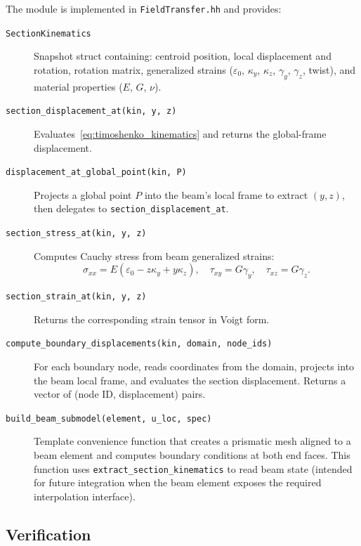 The module is implemented in \texttt{FieldTransfer.hh} and provides:

\begin{description}
  \item[\texttt{SectionKinematics}] Snapshot struct containing: centroid
    position, local displacement and rotation, rotation matrix, generalized
    strains ($\varepsilon_0$, $\kappa_y$, $\kappa_z$, $\gamma_y$,
    $\gamma_z$, twist), and material properties ($E$, $G$, $\nu$).

  \item[\texttt{section\_displacement\_at(kin, y, z)}]
    Evaluates~\eqref{eq:timoshenko_kinematics} and returns the
    global-frame displacement.

  \item[\texttt{displacement\_at\_global\_point(kin, P)}]
    Projects a global point $P$ into the beam's local frame to extract
    $(y, z)$, then delegates to \texttt{section\_displacement\_at}.

  \item[\texttt{section\_stress\_at(kin, y, z)}]
    Computes Cauchy stress from beam generalized strains:
    \[
      \sigma_{xx} = E(\varepsilon_0 - z\kappa_y + y\kappa_z), \quad
      \tau_{xy} = G\gamma_y, \quad \tau_{xz} = G\gamma_z.
    \]

  \item[\texttt{section\_strain\_at(kin, y, z)}]
    Returns the corresponding strain tensor in Voigt form.

  \item[\texttt{compute\_boundary\_displacements(kin, domain, node\_ids)}]
    For each boundary node, reads coordinates from the domain, projects
    into the beam local frame, and evaluates the section displacement.
    Returns a vector of (node ID, displacement) pairs.

  \item[\texttt{build\_beam\_submodel(element, u\_loc, spec)}]
    Template convenience function that creates a prismatic mesh aligned
    to a beam element and computes boundary conditions at both end faces.
    This function uses \texttt{extract\_section\_kinematics} to read beam
    state (intended for future integration when the beam element exposes
    the required interpolation interface).
\end{description}

\subsection{Verification}

